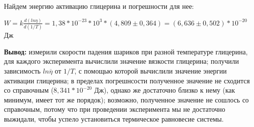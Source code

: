 \documentclass[a4paper]{article}
\begin{document}
	Найдем энергию активацию глицерина и погрешности для нее:
	
	$W = k \frac{d(ln\eta)}{d(1/T)} = 1,38 * 10^{-23} * 10^{3} * (4,809 \pm 0,364) = (6,636 \pm 0,502) * 10^{-20}$ Дж
	
	
	
	\textbf{Вывод:} измерили скорости падения шариков при разной температуре глицерина, для каждого эксперимента вычислили значение вязкости глицерина; получили зависимость $ln\overline{\eta}$ от $1/T$, с помощью которой вычислили значение энергии активации глицерина; в пределах погрешнсости полученное значение не сходится со справочным ($8,341 * 10^{-20}$ Дж), однако же достаточно близко к нему (как минимум, имеет тот же порядок); возможно, полученное значение не сошлось со справочным, потому что при проведении эксперимента мы не достаточно выжидали, чтобы успело установиться термическое равновесие системы.
	

	
\end{document}
